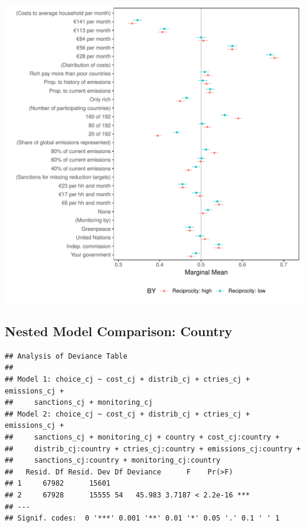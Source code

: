 \documentclass[a4paper,12pt]{article}\usepackage[]{graphicx}\usepackage[]{color}
\makeatletter
\def\maxwidth{ %
  \ifdim\Gin@nat@width>\linewidth
    \linewidth
  \else
    \Gin@nat@width
  \fi
}
\newenvironment{kframe}{%
 \def\at@end@of@kframe{}%
 \ifinner\ifhmode%
  \def\at@end@of@kframe{\end{minipage}}%
  \begin{minipage}{\columnwidth}%
 \fi\fi%
 \def\FrameCommand##1{\hskip\@totalleftmargin \hskip-\fboxsep
 \colorbox{shadecolor}{##1}\hskip-\fboxsep
     \hskip-\linewidth \hskip-\@totalleftmargin \hskip\columnwidth}%
 \MakeFramed {\advance\hsize-\width
   \@totalleftmargin\z@ \linewidth\hsize
   \@setminipage}}%
 {\par\unskip\endMakeFramed%
 \at@end@of@kframe}
\newenvironment{knitrout}{}{} %
\makeatother
\begin{document}
\begin{knitrout}
\color{fgcolor}
\includegraphics[width=\maxwidth]{figure/bechtel_subgroup_mm_reciprocity-1} 

\end{knitrout}

\clearpage

\subsection{Nested Model Comparison: Country}

\begin{knitrout}
\color{fgcolor}\begin{kframe}
\begin{verbatim}
## Analysis of Deviance Table
## 
## Model 1: choice_cj ~ cost_cj + distrib_cj + ctries_cj + emissions_cj + 
##     sanctions_cj + monitoring_cj
## Model 2: choice_cj ~ cost_cj + distrib_cj + ctries_cj + emissions_cj + 
##     sanctions_cj + monitoring_cj + country + cost_cj:country + 
##     distrib_cj:country + ctries_cj:country + emissions_cj:country + 
##     sanctions_cj:country + monitoring_cj:country
##   Resid. Df Resid. Dev Df Deviance      F    Pr(>F)    
## 1     67982      15601                                 
## 2     67928      15555 54   45.983 3.7187 < 2.2e-16 ***
## ---
## Signif. codes:  0 '***' 0.001 '**' 0.01 '*' 0.05 '.' 0.1 ' ' 1
\end{verbatim}
\end{kframe}
\end{knitrout}
\end{document}
